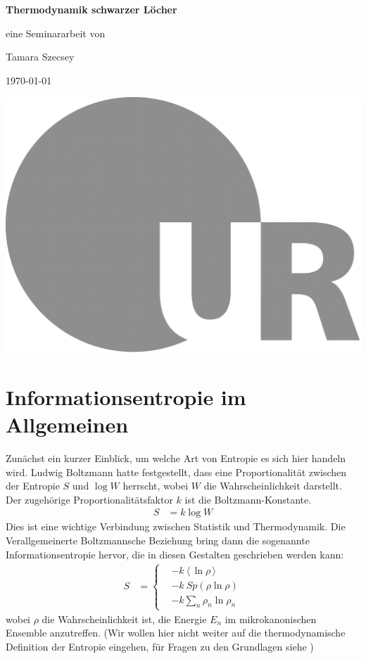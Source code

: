 \documentclass[ngerman]{scrartcl}
\newcommand{\erw}[1]{\langle {#1} \rangle}
\begin{document}
 
	\begin{titlepage}
		\begin{minipage}[c][\textheight][c]{\textwidth}
			\begin{center}
				{ \Huge \textbf{Thermodynamik schwarzer Löcher} }
				
				\vspace*{1cm}
				{\large eine Seminararbeit von}
				
				\vspace*{0.2cm}
				{\Large Tamara Szecsey}
				
				\vspace*{1cm}
				{\large \today}
				
				\vspace*{4cm}
				\hspace*{1cm} \includegraphics[height=30ex]{LOGO_UR}
			\end{center}
		\end{minipage}
	\end{titlepage}
	
\tableofcontents
\newpage

\section{Informationsentropie im Allgemeinen} \label{InfoentropieAllg}
Zunächst ein kurzer Einblick, um welche Art von Entropie es sich hier handeln wird. Ludwig Boltzmann hatte festgestellt, dass eine Proportionalität zwischen der Entropie $S$ und $\log W$ herrscht, wobei $W$ die Wahrscheinlichkeit darstellt. Der zugehörige Proportionalitätsfaktor $k$ ist die Boltzmann-Konstante.
	\begin{align}
		S &= k \log W
	\end{align}
Dies ist eine wichtige Verbindung zwischen Statistik und Thermodynamik. 
Die Verallgemeinerte Boltzmannsche Beziehung bring dann die sogenannte Informationsentropie hervor, die in diesen Gestalten geschrieben werden kann:	
	\begin{align} \label{Informationsentropie}
		S &=
		\left\{
		\begin{aligned}
		&- k ~\erw{\,\ln \rho\,} \\
		&-k~ Sp(\rho \ln \rho) \\
		&-k \sum_n \rho_n \ln \rho_n
		\end{aligned}
		\right.
	\end{align}
wobei $\rho$ die Wahrscheinlichkeit ist, die Energie $E_n$ im mikrokanonischen Ensemble anzutreffen. 
(Wir wollen hier nicht weiter auf die thermodynamische Definition der Entropie eingehen, für Fragen zu den Grundlagen siehe \cite{Brenig})
\end{document}
